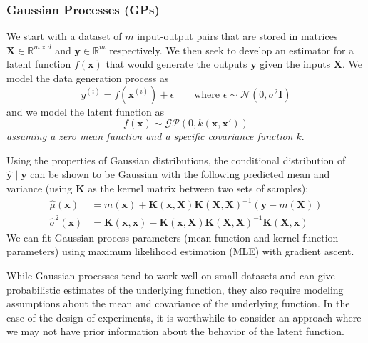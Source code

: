 \documentclass[conference,final]{IEEEtran}
\begin{document}
	\subsubsection{Gaussian Processes (GPs)}

	We start with a dataset of $m$ input-output pairs that are stored in matrices $\mathbf{X} \in \mathbb{R}^{m \times d}$ and $\mathbf{y} \in \mathbb{R}^{m}$ respectively. We then seek to develop an estimator for a latent function $f(\mathbf{x})$ that would generate the outputs $\mathbf{y}$ given the inputs $\mathbf{X}$. We model the data generation process as
	\begin{equation}
	    y^{(i)} = f(\boldsymbol{x}^{(i)}) + \epsilon \qquad \text{where~}\epsilon \sim \mathcal{N}(0, \sigma^2 \boldsymbol{I})
	\end{equation}
	and we model the latent function as
	\begin{equation}
	    f(\boldsymbol{x}) \sim \mathcal{GP}(0, k(\boldsymbol{x}, \boldsymbol{x}'))
	\end{equation}
	\textit{assuming a zero mean function and a specific covariance function $k$}.
	
	Using the properties of Gaussian distributions, the conditional distribution of $\hat{\boldsymbol{y}} \mid \boldsymbol{y}$ can be shown to be Gaussian with the following predicted mean and variance (using $\boldsymbol{K}$ as the kernel matrix between two sets of samples):
	\begin{align}
	    \hat{\mu}(\boldsymbol{x}) &= m(\boldsymbol{x}) + \boldsymbol{K}(\boldsymbol{x}, \boldsymbol{X})\boldsymbol{K}(\boldsymbol{X}, \boldsymbol{X})^{-1}(\boldsymbol{y} - m(\boldsymbol{X})) \\
	    \hat{\sigma}^2(\boldsymbol{x}) &= \boldsymbol{K}(\boldsymbol{x}, \boldsymbol{x}) - \boldsymbol{K}(\boldsymbol{x}, \boldsymbol{X})\boldsymbol{K}(\boldsymbol{X}, \boldsymbol{X})^{-1}\boldsymbol{K}(\boldsymbol{X}, \boldsymbol{x})
	\end{align}
    We can fit Gaussian process parameters (mean function and kernel function parameters) using maximum likelihood estimation (MLE) with gradient ascent. 

    While Gaussian processes tend to work well on small datasets and can give probabilistic estimates of the underlying function, they also require modeling assumptions about the mean and covariance of the underlying function. In the case of the design of experiments, it is worthwhile to consider an approach where we may not have prior information about the behavior of the latent function.
    
\end{document}
